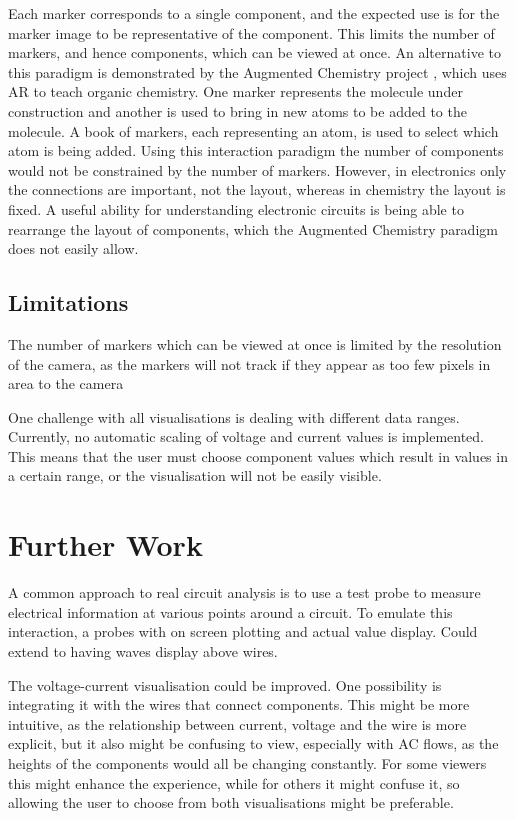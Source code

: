 Each marker corresponds to a single component, and the expected use is for the marker image to be representative of the component. This limits the number of markers, and hence components, which can be viewed at once. An alternative to this paradigm is demonstrated by the Augmented Chemistry project \cite{fjeld07}, which uses AR to teach organic chemistry. One marker represents the molecule under construction and another is used to bring in new atoms to be added to the molecule. A book of markers, each representing an atom, is used to select which atom is being added. Using this interaction paradigm the number of components would not be constrained by the number of markers. However, in electronics only the connections are important, not the layout, whereas in chemistry the layout is fixed. A useful ability for understanding electronic circuits is being able to rearrange the layout of components, which the Augmented Chemistry paradigm does not easily allow.


\subsection{Limitations}


The number of markers which can be viewed at once is limited by the resolution of the camera, as the markers will not track if they appear as too few pixels in area to the camera

One challenge with all visualisations is dealing with different data ranges. Currently, no automatic scaling of voltage and current values is implemented. This means that the user must choose component values which result in values in a certain range, or the visualisation will not be easily visible. 

\section{Further Work}

A common approach to real circuit analysis is to use a test probe to measure electrical information at various points around a circuit. To emulate this interaction, a probes with on screen plotting and actual value display. Could extend to having waves display above wires.

The voltage-current visualisation could be improved. One possibility is integrating it with the wires that connect components. This might be more intuitive, as the relationship between current, voltage and the wire is more explicit, but it also might be confusing to view, especially with AC flows, as the heights of the components would all be changing constantly. For some viewers this might enhance the experience, while for others it might confuse it, so allowing the user to choose from both visualisations might be preferable.

